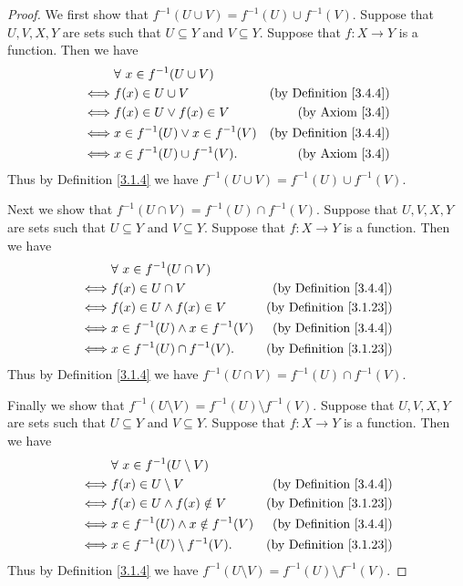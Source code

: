 \begin{proof}
We first show that \(f^{-1}(U \cup V) = f^{-1}(U) \cup f^{-1}(V)\).
Suppose that \(U, V, X, Y\) are sets such that \(U \subseteq Y\) and \(V \subseteq Y\).
Suppose that \(f : X \to Y\) is a function.
Then we have
\begin{align*}
& \forall\ x \in f^{-1}(U \cup V) \\
\iff & f(x) \in U \cup V & \text{(by Definition \ref{3.4.4})} \\
\iff & f(x) \in U \lor f(x) \in V & \text{(by Axiom \ref{3.4})} \\
\iff & x \in f^{-1}(U) \lor x \in f^{-1}(V) & \text{(by Definition \ref{3.4.4})} \\
\iff & x \in f^{-1}(U) \cup f^{-1}(V). & \text{(by Axiom \ref{3.4})}
\end{align*}
Thus by Definition \ref{3.1.4} we have \(f^{-1}(U \cup V) = f^{-1}(U) \cup f^{-1}(V)\).

Next we show that \(f^{-1}(U \cap V) = f^{-1}(U) \cap f^{-1}(V)\).
Suppose that \(U, V, X, Y\) are sets such that \(U \subseteq Y\) and \(V \subseteq Y\).
Suppose that \(f : X \to Y\) is a function.
Then we have
\begin{align*}
& \forall\ x \in f^{-1}(U \cap V) \\
\iff & f(x) \in U \cap V & \text{(by Definition \ref{3.4.4})} \\
\iff & f(x) \in U \land f(x) \in V & \text{(by Definition \ref{3.1.23})} \\
\iff & x \in f^{-1}(U) \land x \in f^{-1}(V) & \text{(by Definition \ref{3.4.4})} \\
\iff & x \in f^{-1}(U) \cap f^{-1}(V). & \text{(by Definition \ref{3.1.23})}
\end{align*}
Thus by Definition \ref{3.1.4} we have \(f^{-1}(U \cap V) = f^{-1}(U) \cap f^{-1}(V)\).

Finally we show that \(f^{-1}(U \setminus V) = f^{-1}(U) \setminus f^{-1}(V)\).
Suppose that \(U, V, X, Y\) are sets such that \(U \subseteq Y\) and \(V \subseteq Y\).
Suppose that \(f : X \to Y\) is a function.
Then we have
\begin{align*}
& \forall\ x \in f^{-1}(U \setminus V) \\
\iff & f(x) \in U \setminus V & \text{(by Definition \ref{3.4.4})} \\
\iff & f(x) \in U \land f(x) \notin V & \text{(by Definition \ref{3.1.23})} \\
\iff & x \in f^{-1}(U) \land x \notin f^{-1}(V) & \text{(by Definition \ref{3.4.4})} \\
\iff & x \in f^{-1}(U) \setminus f^{-1}(V). & \text{(by Definition \ref{3.1.23})}
\end{align*}
Thus by Definition \ref{3.1.4} we have \(f^{-1}(U \setminus V) = f^{-1}(U) \setminus f^{-1}(V)\).
\end{proof}


